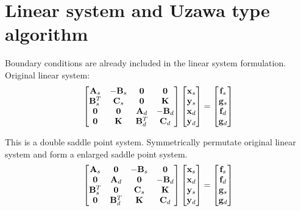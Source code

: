 \newpage



\newpage

\section{Linear system and Uzawa type algorithm}

Boundary conditions are already included in the linear system formulation.
Original linear system:
\begin{equation}
\begin{bmatrix}
\bold{A}_s   & -\bold{B}_s & \bold{0}     &  \bold{0}   \\
\bold{B}_s^T &  \bold{C}_s & \bold{0}     &  \bold{K}   \\
\bold{0}     &  \bold{0}   & \bold{A}_d   & -\bold{B}_d \\
\bold{0}     &  \bold{K}   & \bold{B}_d^T &  \bold{C}_d
\end{bmatrix} \begin{bmatrix}
\bold{x}_s\\
\bold{y}_s\\
\bold{x}_d\\
\bold{y}_d
\end{bmatrix}= 
\begin{bmatrix}
\bold{f}_s\\
\bold{g}_s\\
\bold{f}_d\\
\bold{g}_d
\end{bmatrix}
\end{equation}

This is a double saddle point system. 
Symmetrically permutate original linear system and form a enlarged saddle point system.
\begin{equation}
\begin{bmatrix}
\bold{A}_s   & \bold{0}     & -\bold{B}_s &  \bold{0}   \\
\bold{0}     & \bold{A}_d   &  \bold{0}   & -\bold{B}_d \\
\bold{B}_s^T & \bold{0}     &  \bold{C}_s &  \bold{K}   \\
\bold{0}     & \bold{B}_d^T &  \bold{K}   &  \bold{C}_d
\end{bmatrix} \begin{bmatrix}
\bold{x}_s\\
\bold{x}_d\\
\bold{y}_s\\
\bold{y}_d
\end{bmatrix}= 
\begin{bmatrix}
\bold{f}_s\\
\bold{f}_d\\
\bold{g}_s\\
\bold{g}_d
\end{bmatrix}
\end{equation}

